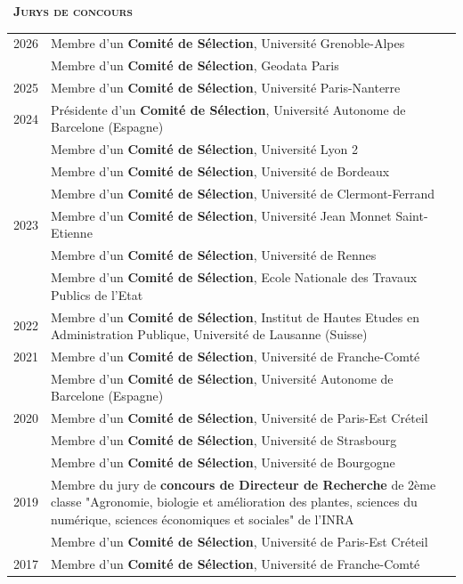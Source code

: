 \documentclass[a4paper,12pt]{article}
\newcommand{\smalltitre}[1]{%
	\noindent \textbullet~\textsc{\textbf{#1}}
	\smallskip
	}
\begin{document}
\smalltitre{Jurys de concours} 

\noindent \begin{longtable}{@{}p{\annee}p{\texte}@{}}
2026		& Membre d'un \textbf{Comité de Sélection}, Université Grenoble-Alpes\\
		& Membre d'un \textbf{Comité de Sélection}, Geodata Paris\\
2025		& Membre d'un \textbf{Comité de Sélection}, Université Paris-Nanterre\\
2024		& Présidente d'un \textbf{Comité de Sélection}, Université Autonome de Barcelone (Espagne) \\
		& Membre d'un \textbf{Comité de Sélection}, Université Lyon 2\\
		& Membre d'un \textbf{Comité de Sélection}, Université de Bordeaux \\
		& Membre d'un \textbf{Comité de Sélection}, Université de Clermont-Ferrand \\
2023		& Membre d'un \textbf{Comité de Sélection}, Université Jean Monnet  Saint-Etienne \\
		& Membre d'un \textbf{Comité de Sélection}, Université de Rennes \\
		& Membre d'un \textbf{Comité de Sélection}, Ecole Nationale des Travaux Publics de l'Etat \\
2022		& Membre d'un \textbf{Comité de Sélection}, Institut de Hautes Etudes en Administration Publique, Université de Lausanne (Suisse) \\
2021		& Membre d'un \textbf{Comité de Sélection}, Université de Franche-Comté \\	
		& Membre d'un \textbf{Comité de Sélection}, Université Autonome de Barcelone (Espagne) \\
2020		& Membre d'un \textbf{Comité de Sélection}, Université de Paris-Est Créteil \\
		& Membre d'un \textbf{Comité de Sélection}, Université de Strasbourg \\
		& Membre d'un \textbf{Comité de Sélection}, Université de Bourgogne \\
2019		& Membre du jury de \textbf{concours de Directeur de Recherche} de 2ème classe "Agronomie, biologie et amélioration des plantes, sciences du numérique, sciences économiques et sociales" de l'INRA \\
		& Membre d'un \textbf{Comité de Sélection}, Université de Paris-Est Créteil \\
2017 		& Membre d'un \textbf{Comité de Sélection}, Université de Franche-Comté \\

\end{longtable}
\end{document}
